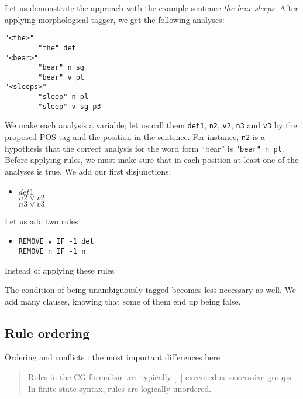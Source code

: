 \documentclass[11pt]{article}
\begin{document}
Let us demonstrate the approach with the example sentence 
\emph{the bear sleeps}. After applying morphological tagger, we get the following analyses:

\begin{verbatim}
"<the>"
        "the" det
"<bear>"
        "bear" n sg
        "bear" v pl
"<sleeps>"
        "sleep" n pl
        "sleep" v sg p3
\end{verbatim}

We make each analysis a variable; let us call them \texttt{det1}, \texttt{n2}, \texttt{v2}, \texttt{n3} and \texttt{v3} by the proposed POS tag and the position in the sentence.
For instance, \texttt{n2} is a hypothesis that the correct analysis 
for the word form ``bear'' is \texttt{"bear" n pl}.
Before applying rules, we must make sure that in each position
at least one of the analyses is true. We add our first disjunctions:

\begin{itemize}
\item [] $det1$ \\ $n2 \vee v2$ \\ $n3 \vee v3$
\end{itemize}

Let us add two rules
\begin{itemize}
\item [] \texttt{REMOVE v IF -1 det} \\ \texttt{REMOVE n IF -1 n}
\end{itemize}

Instead of applying these rules 

The condition of being unambiguously tagged becomes less necessary as well.
We add many clauses, knowing that some of them end up being false.

\subsection{Rule ordering}
\label{ssec:ordering}

Ordering and conflicts : the most important differences here

\cite{koskenniemi92}
\begin{quote}Rules in the CG formalism are typically [--] executed as successive groups.
In finite-state syntax, rules are logically unordered.\end{quote}

\end{document}

